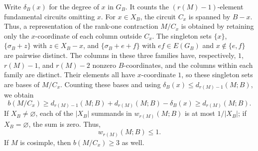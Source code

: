 \documentclass[10pt,a4paper]{article}
\numberwithin{equation}{section}
\newcommand{\wloc}[1]{w_{#1}(M;B)}
\newcommand{\dloc}[1]{d_{#1}(M;B)}
\begin{document}
Write \(\delta_B(x)\) for the degree of \(x\) in \(G_B\). It counts the \((r(M)-1)\)-element fundamental circuits omitting \(x\).
For \(x\in X_B\), the circuit \(C_x\) is spanned by \(B-x\).
Thus, a representation of the rank-one contraction \(M/C_x\)
is obtained by retaining only the \(x\)-coordinate of each column outside \(C_x\).
The singleton sets \(\{x\}\), \(\{\sigma_B+z\}\) with
\(z\in X_B-x\), and \(\{\sigma_B+e+f\}\) with
\(ef\in E(G_B)\) and \(x\notin\{e,f\}\) are pairwise distinct.
The columns in these three families have, respectively, \(1\), \(r(M)-1\), and \(r(M)-2\)
nonzero \(B\)-coordinates, and the columns within each family are distinct.
Their elements all have \(x\)-coordinate \(1\), so these singleton sets
are bases of \(M/C_x\).
Counting these bases and using \(\delta_B(x)\le\dloc{r(M)-1}\), we obtain
\begin{equation}\label{eq:rank-one-selected}
 b(M/C_x)\ge
 \dloc{r(M)-1}+\dloc{r(M)}-\delta_B(x)
 \ge\dloc{r(M)}.
\end{equation}
If \(X_B\ne\varnothing\), each of the \(|X_B|\) summands in
\(\wloc{r(M)}\) is at most \(1/|X_B|\); if \(X_B=\varnothing\),
the sum is zero. Thus,
\begin{equation}\label{eq:general-rank-one-weight}
 \wloc{r(M)}\le1.
\end{equation}
If \(M\) is cosimple, then \(b(M/C_x)\ge3\) as well.
\end{document}
